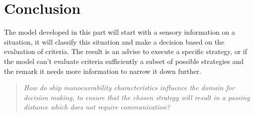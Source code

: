 \chapter{Conclusion}
The model developed in this part will start with a sensory information on a situation, it will classify this situation and make a decision based on the evaluation of criteria. The result is an advise to execute a specific strategy, or if the model can't evaluate criteria sufficiently a subset of possible strategies and the remark it needs more information to narrow it down further.

\begin{quotation}
	\emph{How do ship manoeuvrability characteristics influence the domain for decision making, to ensure that the chosen strategy will result in a passing distance which does not require communication?} 
\end{quotation}
